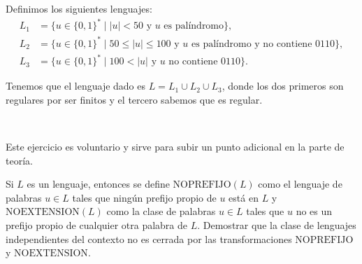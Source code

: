 \documentclass[12pt]{article}
\begin{document}
\begin{ejercicio}[2.5 puntos]
\begin{enumerate}
            Definimos los siguientes lenguajes:
            \begin{align*}
                L_1 &= \{u\in \{0,1\}^*\mid |u|< 50\text{ y }u\text{ es palíndromo}\}, \\
                L_2 &= \{u\in \{0,1\}^*\mid 50\leq |u|\leq 100\text{ y }u\text{ es palíndromo y no contiene }0110\}, \\
                L_3 &= \{u\in \{0,1\}^*\mid 100< |u|\text{ y }u\text{ no contiene }0110\}.
            \end{align*}

            Tenemos que el lenguaje dado es $L=L_1\cup L_2\cup L_3$, donde los dos primeros son regulares por ser finitos y el tercero sabemos que es regular.
        \end{enumerate}
    \end{ejercicio}

    \begin{ejercicio}[1 punto]~
        \begin{observacion}
            Este ejercicio es voluntario y sirve para subir un punto adicional en la parte de teoría.
        \end{observacion}
        Si $L$ es un lenguaje, entonces se define $\text{NOPREFIJO}(L)$ como el lenguaje de palabras $u \in L$ tales que ningún prefijo propio de $u$ está en $L$ y $\text{NOEXTENSION}(L)$ como la clase de palabras $u \in L$ tales que $u$ no es un prefijo propio de cualquier otra palabra de $L$. Demostrar que la clase de lenguajes independientes del contexto no es cerrada por las transformaciones $\text{NOPREFIJO}$ y $\text{NOEXTENSION}$.
    \end{ejercicio}
\end{document}
